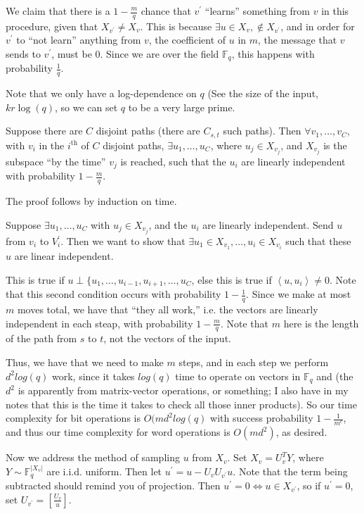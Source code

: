 \documentclass[11pt]{article}
\newcommand{\F}{\mathbb{F}}
\begin{document}
We claim that there is a $1 - \frac{m}{q}$ chance that $v^\prime$ ``learns'' something from $v$ in this
procedure, given that $X_{v^\prime} \neq X_v$. This is because $\exists u\in X_v, \notin X_{v^\prime}$,
and in order for $v^\prime$ to ``not learn'' anything from $v$, the coefficient of $u$ in $m$, the message 
that $v$ sends to $v^\prime$, must be 0. Since we are over the field $\F_q$, this happens with probability
$\frac{1}{q}$.

Note that we only have a log-dependence on $q$ (See the size of the input, $kr\log(q)$, so we can set 
$q$ to be a very large prime.

Suppose there are $C$ disjoint paths (there are $C_{s,t}$ such paths). Then $\forall v_1, \ldots, v_C$,
with $v_i$ in the $i^{\text{th}}$ of $C$ disjoint paths, $\exists u_1, \ldots, u_C$, where $u_j \in X_{v_j}$,
and $X_{v_j}$ is the subspace ``by the time'' $v_j$ is reached, such that the $u_i$ are linearly independent
with probability $1 - \frac{m}{q}$.

The proof follows by induction on time. 

Suppose $\exists u_1, \ldots, u_C$ with $u_j \in X_{v_j}$, and the $u_i$ are linearly independent. 
Send $u$ from $v_i$ to $V_i^\prime$. Then we want to show that $\exists u_1 \in X_{v_1}, \ldots, u_i \in
X_{v_i}$ such that these $u$ are linear independent. 

This is true if $u \perp \{u_1, \ldots, u_{i-1}, u_{i+1}, \ldots, u_C$, else this is true if
$\left<u, u_i\right> \neq 0$. Note that this second condition occurs with probability $1 - \frac{1}{q}$.
Since we make at most $m$ moves total, we have that ``they all work,'' i.e. the vectors are linearly 
independent in each steap, with probability $1 - \frac{m}{q}$. Note that $m$ here is the length of the
path from $s$ to $t$, not the vectors of the input.

Thus, we have that we need to make $m$ steps, and in each step we perform $d^2log(q)$ work, since it 
takes $log(q)$ time to operate on vectors in $\F_q$ and (the $d^2$ is apparently from matrix-vector operations,
or something; I also have in my notes that this is the time it takes to check all those inner products).
So our time complexity for bit operations is $O(md^2log(q)$ with success probability $1 - \frac{1}{m^c}$,
and thus our time complexity for word operations is $O(md^2)$, as desired.

Now we address the method of sampling $u$ from $X_v$. Set $X_v = U_v^TY$, where $Y \sim \F_q^{|X_v|}$ are 
i.i.d. uniform. Then let $u^\prime = u - U_vU_{v^\prime}u$. Note that the term being subtracted should
remind you of projection. Then $u^\prime = 0 \iff u \in X_{v^\prime}$, so if $u^\prime = 0$, set 
$U_{v^\prime} = \left[\frac{U_v}{u}\right]$. 
\end{document}
